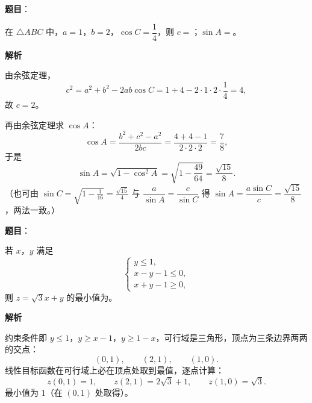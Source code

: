 \begin{answer}

\textbf{题目}：

在 $\triangle ABC$ 中，$a=1$，$b=2$，$\cos C=\dfrac14$，则 $c=$\gkblank{}；$\sin A=$\gkblank{}。

\textbf{解析}

由余弦定理，
\nopagebreak[4]
\[c^2=a^2+b^2-2ab\cos C=1+4-2\cdot1\cdot2\cdot\frac14=4,\]
故 $c=2$。

再由余弦定理求 $\cos A$：
\nopagebreak[4]
\[\cos A=\frac{b^2+c^2-a^2}{2bc}=\frac{4+4-1}{2\cdot2\cdot2}=\frac78,\]
于是
\nopagebreak[4]
\[\sin A=\sqrt{1-\cos^2A}=\sqrt{1-\frac{49}{64}}=\frac{\sqrt{15}}8 .\]
（也可由 $\sin C=\sqrt{1-\frac1{16}}=\frac{\sqrt{15}}4$ 与 $\dfrac{a}{\sin A}=\dfrac{c}{\sin C}$ 得 $\sin A=\dfrac{a\sin C}{c}=\dfrac{\sqrt{15}}8$，两法一致。）


\end{answer}
\begin{answer}

\textbf{题目}：

若 $x$，$y$ 满足
\nopagebreak[4]
\[\begin{cases}
y\leqslant 1,\\
x-y-1\leqslant 0,\\
x+y-1\geqslant 0,
\end{cases}\]
则 $z=\sqrt3x+y$ 的最小值为\gkblank{}。

\textbf{解析}

约束条件即 $y\leqslant 1$，$y\geqslant x-1$，$y\geqslant 1-x$，可行域是三角形，顶点为三条边界两两的交点：
\nopagebreak[4]
\[(0,1),\qquad (2,1),\qquad (1,0).\]
线性目标函数在可行域上必在顶点处取到最值，逐点计算：
\nopagebreak[4]
\[z(0,1)=1,\qquad z(2,1)=2\sqrt3+1,\qquad z(1,0)=\sqrt3 .\]
最小值为 $1$（在 $(0,1)$ 处取得）。


\end{answer}
